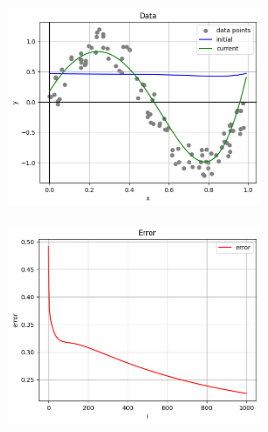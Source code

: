 \documentclass[11pt]{article}
\begin{document}
    \includegraphics[width=0.5\textwidth]{../img/output3.png}

    \includegraphics[width=0.5\textwidth]{../img/output4.png}
\end{document}
